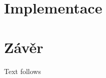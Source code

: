 \documentclass{ctuthesis}
\begin{document}
	\maketitle

	

	
 
	
	  
  	  

	\chapter{Implementace}

	\chapter{Závěr}
	Text follows
	
	
	
	
	
	
	
	
	
	
\end{document}

